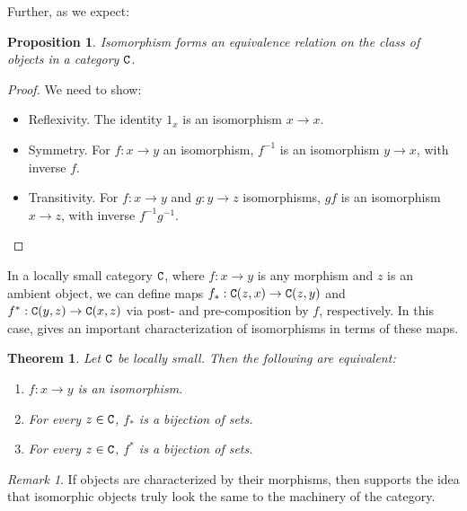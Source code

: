 \documentclass[11 pt]{amsart}
\theoremstyle{plain}   %
\newtheorem{thm}{Theorem}[section] %
\newtheorem{prop}{Proposition}[section]
\theoremstyle{definition}
\theoremstyle{remark}
\newtheorem{rem}{Remark}[section]
\numberwithin{equation}{section}
\newcommand{\cat}[1]{{\normalfont\texttt{#1}}}
\begin{document}
Further, as we expect:

\begin{prop}\label{isomorphism is equivalence}
	Isomorphism forms an equivalence relation on the class of objects in
	a category $\cat{C}$.
\end{prop}

\begin{proof} We need to show:
	\begin{itemize}
		\item Reflexivity. The identity $1_x$ is an isomorphism $x\rightarrow x$.
		\item Symmetry. For $f: x\rightarrow y$ an isomorphism, $f^{-1}$ is an
		      isomorphism $y\rightarrow x$, with inverse $f$.
		\item Transitivity. For $f: x\rightarrow y$ and $g: y\rightarrow z$
		      isomorphisms, $gf$ is an isomorphism $x\rightarrow z$, with inverse
		      $f^{-1}g^{-1}$. \qedhere
	\end{itemize}
\end{proof}

In a locally small category $\cat{C}$, where $f: x\rightarrow y$ is any morphism
and $z$ is an ambient object, we can define maps $f_*: \cat{C}(z, x)\rightarrow
	\cat{C}(z, y)$ and $f^*: \cat{C}(y, z)\rightarrow \cat{C}(x, z)$ via post- and
pre-composition by $f$, respectively. In this case,  gives an important characterization of isomorphisms in terms
of these maps.

\begin{thm}\label{isomorphism characterization}Let $\cat{C}$ be locally small.
	Then the following are equivalent:

	\begin{enumerate}
		\item  $f: x\rightarrow y$ is an isomorphism.
		\item  For every $z\in\cat{C}$, $f_*$ is a bijection of sets.
		\item For every $z\in\cat{C}$, $f^*$ is a bijection of sets.
	\end{enumerate}
\end{thm}

\begin{rem}
	If objects are characterized by their morphisms, then  supports the idea that isomorphic objects truly look the
	same to the machinery of the category.
\end{rem}
\end{document}
